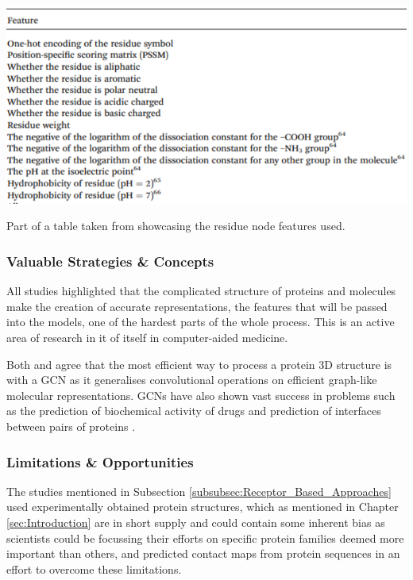\begin{table}[!h]
  \centering
  \includegraphics[width=1.0\linewidth]{images/Jiang_Residue_Node_Features.pdf}
   \caption{Part of a table taken from \citet{Jiang2020} showcasing the residue node features used.}
  \label{tbl:Jiang_Residue_Node_Features}
\end{table}

\subsubsection{Valuable Strategies \& Concepts}

All studies highlighted that the complicated structure of proteins and molecules make the creation of accurate representations, the features that will be passed into the models, one of the hardest parts of the whole process. This is an active area of research in it of itself in computer-aided medicine. \citep{Jiang2020}

Both \citet{Jiang2020} and \citet{Gligorijević} agree that the most efficient way to process a protein 3D structure is with a GCN as it generalises convolutional operations on efficient graph-like molecular representations. GCNs have also shown vast success in problems such as the prediction of biochemical activity of drugs and prediction of interfaces between pairs of proteins \citep{Gligorijević}.

\subsubsection{Limitations \& Opportunities}

The studies mentioned in Subsection \ref{subsubsec:Receptor_Based_Approaches} used experimentally obtained protein structures, which as mentioned in Chapter \ref{sec:Introduction} are in short supply and could contain some inherent bias as scientists could be focussing their efforts on specific protein families deemed more important than others, and predicted contact maps from protein sequences in an effort to overcome these limitations. 

